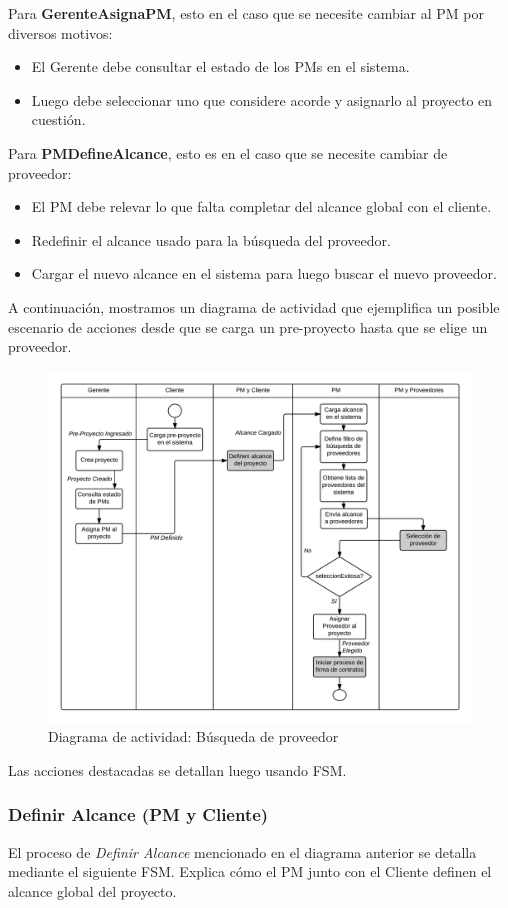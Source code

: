 Para \textbf{GerenteAsignaPM}, esto en el caso que se necesite cambiar al PM 
por diversos motivos:
\begin{itemize}
	\item El Gerente debe consultar el estado de los PMs en el sistema. 
	\item Luego debe seleccionar uno que considere acorde y asignarlo al proyecto 
	en cuestión. 
\end{itemize}

Para \textbf{PMDefineAlcance}, esto es en el caso que se necesite cambiar de proveedor:
\begin{itemize}
	\item El PM debe relevar lo que falta completar del alcance global 
	con el cliente. 
	\item Redefinir el alcance usado para la búsqueda del proveedor. 
	\item Cargar el nuevo alcance en el sistema para luego buscar el nuevo proveedor. 
\end{itemize}

A continuación, mostramos un diagrama de actividad que ejemplifica un posible 
escenario de acciones desde que se carga un pre-proyecto hasta que se elige un 
proveedor. 

\begin{figure}[H]
\centering
\includegraphics[width=0.8\linewidth]{diag/nuevos/act-busqprov.png}
\caption{Diagrama de actividad: Búsqueda de proveedor}
\label{act-busqprov}
\end{figure}

Las acciones destacadas se detallan luego usando FSM. 


	\subsubsection{Definir Alcance (PM y Cliente)}
El proceso de \textit{Definir Alcance} mencionado en el diagrama anterior 
se detalla mediante el siguiente FSM. Explica cómo el PM junto con el Cliente 
definen el alcance global del proyecto. 

